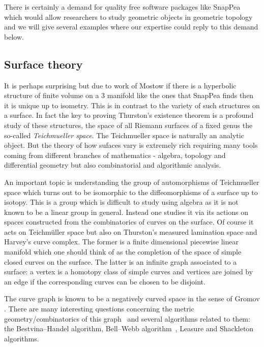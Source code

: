 \documentclass[14pt,fleqn]{article}
\begin{document}
There is certainly a demand for quality free software packages  like SnapPea  which  would allow researchers 
to study geometric objects 
in geometric topology
and 
we will give several examples 
where our expertise could 
reply to this demand below. 



\subsection{Surface theory}


It is perhaps surprising but due to work of Mostow \cite{mostow}
if there is a hyperbolic structure of finite volume on a 3 manifold like the ones that SnapPea finds 
then it is unique up to isometry.
This is in contrast 
to the variety of such structures 
on a surface.
In fact the key to proving Thurston's existence
theorem is a profound study of these 
structures, the
space of all Riemann surfaces of a fixed genus
the so-called \textit{Teichmueller space}.
The Teichmueller space is naturally an analytic object.
But the theory of
how sufaces vary is extremely rich 
requiring many tools coming
from different branches of mathematics - algebra, topology and
differential geometry but also combinatorial and algorithmic analysis.



An important topic is understanding
the group of automorphisms of 
Teichmueller space 
which turns out to be isomorphic to 
the diffeomorphisms of a surface
up to isotopy. 
This is a group which 
is difficult to study using algebra
as it is not known 
to be a linear group in general.
Instead one studies it via its actions on
spaces constructed 
from the combinatorics of curves on the surface. 
Of course  it acts on Teichm\"{u}ller space
but also on 
Thurston’s measured
lamination space \cite{FLP}
 and Harvey’s curve complex. 
The former is a finite dimensional 
piecewise linear manifold 
which one should think of 
as the completion of the space of 
simple closed curves on the surface.
The latter is an infinite
graph associated to a surface: a vertex is a homotopy class of simple
curves and vertices are joined by an edge if the corresponding curves
can be chosen to be disjoint. 


The curve graph is known to be a negatively curved 
space in the sense of Gromov \cite{MM}.
There are many interesting questions
concerning the metric geometry/combinatorics of this graph~\cite{bmm-egead-16} and several
algorithms related to them: the Bestvina–Handel algorithm, Bell–Webb
algorithm~\cite{bw-ptacg-16}, Leasure and Shackleton algorithms.
\end{document}
